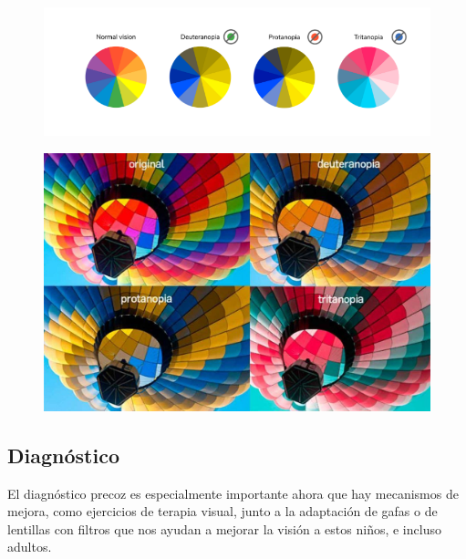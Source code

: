 \documentclass[10pt]{article}
\begin{document}
\begin{figure}[H]
	\begin{center}
\includegraphics[scale = 0.85]{Imagenes/daltonismo.png}
	\end{center} 
\end{figure}

\begin{figure}[H]
	\begin{center}
\includegraphics[scale = 0.25]{Imagenes/daltonismo2.jpg}
	\end{center} 
\end{figure}

\newpage

\subsection{Diagnóstico}

El diagnóstico precoz es especialmente importante ahora que hay mecanismos de mejora, como ejercicios de terapia visual, junto a la adaptación de gafas o de lentillas con filtros que nos ayudan a mejorar la visión a estos niños, e incluso adultos\cite{IEEEreferencias:Ref26}.
\end{document}
